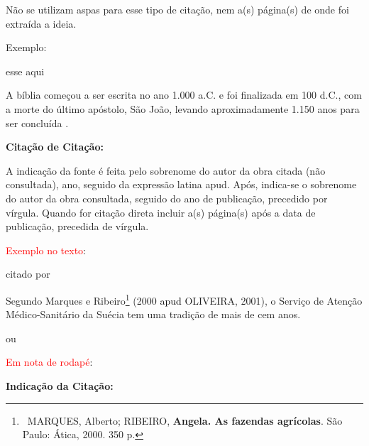 
\bigskip

Não se utilizam aspas para esse tipo de citação, nem a(s) página(s) de onde foi extraída a ideia.\\

\bigskip

{\color{red}
Exemplo:}

\bigskip
esse aqui 

A bíblia começou a ser escrita no ano 1.000 a.C. e foi finalizada em 100 d.C., com a morte do último apóstolo, São João, levando aproximadamente 1.150 anos para ser concluída \cite{book:GHELLER}.\\


\bigskip

{\centering\bfseries\color{red}
Citação de Citação:
\par}

\bigskip

A indicação da fonte é feita pelo sobrenome do autor da obra citada (não consultada), ano, seguido da expressão latina apud. Após, indica-se o sobrenome do autor da obra consultada, seguido do ano de publicação, precedido por vírgula. Quando for citação direta incluir a(s) página(s) após a data de publicação, precedida de vírgula.\\

\bigskip

{\sffamily
\textrm{\textcolor{red}{Exemplo no texto}}\textrm{:}}

\bigskip

{\sffamily
\textrm{citado por }}

\bigskip

{\sffamily
\textrm{Segundo Marques e Ribeiro}\footnote{\ MARQUES, Alberto; RIBEIRO, \textbf{Angela. As fazendas agrícolas}. São
Paulo: Ática, 2000. 350 p.}\textrm{ (2000 }\textrm{\textcolor{black}{apud }}\textrm{OLIVEIRA, 2001),  o Serviço de
Atenção Médico-Sanitário da Suécia tem uma tradição de mais de cem anos. }}

\bigskip

{\color{red}
ou}

{\sffamily
\textrm{\textcolor{red}{Em nota de rodapé}}\textrm{:}}

\bigskip

{\centering\bfseries\color{red}
Indicação da Citação:
\par}

